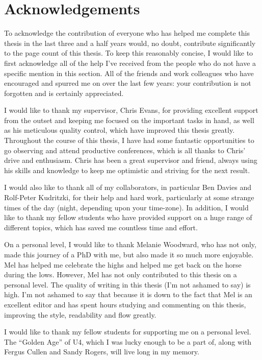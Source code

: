\chapter{Acknowledgements}

To acknowledge the contribution of everyone who has helped me complete this thesis in the last three and a half years would, no doubt, contribute significantly to the page count of this thesis.
To keep this reasonably concise, I would like to first acknowledge all of the help I've received from the people who do not have a specific mention in this section.
All of the friends and work colleagues who have encouraged and spurred me on over the last few years: your contribution is not forgotten and is certainly appreciated.

I would like to thank my supervisor, Chris Evans, for providing excellent support from the outset and keeping me focused on the important tasks in hand, as well as his meticulous quality control, which have improved this thesis greatly.
Throughout the course of this thesis, I have had some fantastic opportunities to go observing and attend productive conferences, which is all thanks to Chris' drive and enthusiasm.
Chris has been a great supervisor and friend, always using his skills and knowledge to keep me optimistic and striving for the next result.

I would also like to thank all of my collaborators, in particular Ben Davies and Rolf-Peter Kudritzki, for their help and hard work, particularly at some strange times of the day (night, depending upon your time-zone).
In addition, I would like to thank my fellow students who have provided support on a huge range of different topics, which has saved me countless time and effort.

On a personal level, I would like to thank Melanie Woodward, who has not only, made this journey of a PhD with me, but also made it so much more enjoyable. Mel has helped me celebrate the highs and helped me get back on the horse during the lows.
However, Mel has not only contributed to this thesis on a personal level.
The quality of writing in this thesis (I'm not ashamed to say) is high.
I'm not ashamed to say that because it is down to the fact that Mel is an excellent editor and has spent hours studying and commenting on this thesis, improving the style, readability and flow greatly.


I would like to thank my fellow students for supporting me on a personal level.
The ``Golden Age'' of U4, which I was lucky enough to be a part of, along with Fergus Cullen and Sandy Rogers, will live long in my memory.
